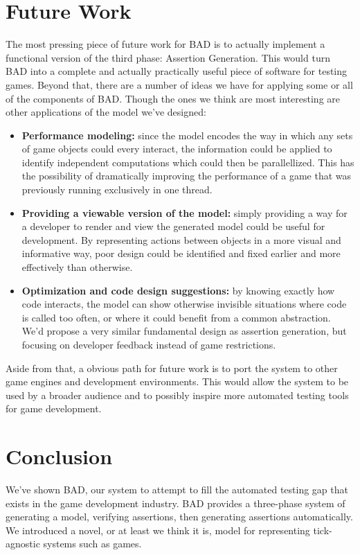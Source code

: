 \documentclass[letterpaper,twocolumn,10pt]{article}
\begin{document}
\section{Future Work}

The most pressing piece of future work for BAD is to actually implement a functional version of the third phase: Assertion Generation. This would turn BAD into a complete and actually practically useful piece of software for testing games. Beyond that, there are a number of ideas we have for applying some or all of the components of BAD. Though the ones we think are most interesting are other applications of the model we've designed:

\begin{itemize}
    \item{\textbf{Performance modeling:}} since the model encodes the way in which any sets of game objects could every interact, the information could be applied to identify independent computations which could then be parallellized. This has the possibility of dramatically improving the performance of a game that was previously running exclusively in one thread.  
    \item {\textbf{Providing a viewable version of the model:}} simply providing a way for a developer to render and view the generated model could be useful for development. By representing actions between objects in a more visual and informative way, poor design could be identified and fixed earlier and more effectively than otherwise.
    \item{\textbf{Optimization and code design suggestions:}} by knowing exactly how code interacts, the model can show otherwise invisible situations where code is called too often, or where it could benefit from a common abstraction. We'd propose a very similar fundamental design as assertion generation, but focusing on developer feedback instead of game restrictions.
\end{itemize}

Aside from that, a obvious path for future work is to port the system to other game engines and development environments. This would allow the system to be used by a broader audience and to possibly inspire more automated testing tools for game development.

\section{Conclusion}

We've shown BAD, our system to attempt to fill the automated testing gap that exists in the game development industry. BAD provides a three-phase system of generating a model, verifying assertions, then generating assertions automatically. We introduced a novel, or at least we think it is, model for representing tick-agnostic systems such as games.\\
\end{document}
